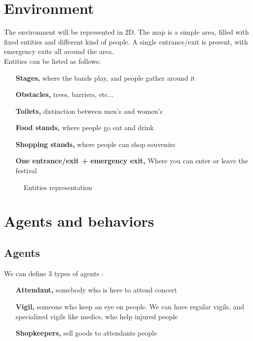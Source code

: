 \section{Environment}

The environment will be represented in 2D. The map is a simple area, filled with
fixed entities and different kind of people. A single entrance/exit is present,
with emergency exits all around the area.\\

Entities can be listed as follows:\\

\begin{itemize}
	\item[{\bf Stages,}] where the bands play, and people gather around it
	\item[{\bf Obstacles,}] trees, barriers, etc...
	\item[{\bf Toilets,}] distinction between men’s and women’s
	\item[{\bf Food stands,}] where people go eat and drink
	\item[{\bf Shopping stands,}] where people can shop souvenirs
	\item[{\bf One entrance/exit + emergency exit,}] Where you can enter or
	leave the festival
\end{itemize}

\begin{figure}[h]
	\begin{center}
	\end{center}
	\caption{Entities representation}
\end{figure}

\section{Agents and behaviors}

\subsection{Agents}

We can define 3 types of agents :\\

\begin{itemize}
	\item[{\bf Attendant,}] somebody who is here to attend concert
	\item[{\bf Vigil,}] someone who keep an eye on people. We can have regular
	vigils, and specialized vigils like medics, who help injured people
	\item[{\bf Shopkeepers,}] sell goods to attendants people
\end{itemize}

